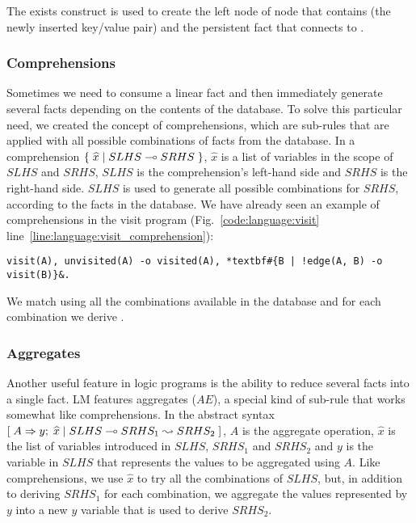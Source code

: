 The exists construct is used to create the left node of node  that
contains  (the newly inserted key/value pair) and
the persistent fact  that connects  to .

\subsubsection{Comprehensions}

Sometimes we need to consume a linear fact and then immediately generate several
facts depending on the contents of the database. To solve this particular need,
we created the concept of comprehensions, which are sub-rules that are applied
with all possible combinations of facts from the database. In a comprehension
$\{ \; \widehat{x} \; | \; SLHS \multimap SRHS \; \}$, $\widehat{x}$ is a list of variables
in the scope of $SLHS$ and $SRHS$, $SLHS$ is the comprehension's left-hand side
and $SRHS$ is the right-hand side. $SLHS$ is used to generate all possible
combinations for $SRHS$, according to the facts in the database. We have already
seen an example of comprehensions in the visit program
(Fig.~\ref{code:language:visit} line~\ref{line:language:visit_comprehension}):

\begin{Verbatim}[fontsize=\codesize,commandchars=\*\#\&]
visit(A), unvisited(A) -o visited(A), *textbf#{B | !edge(A, B) -o visit(B)}&.
\end{Verbatim}

We match  using all the combinations available in the database
and for each combination we derive .

\subsubsection{Aggregates}

Another useful feature in logic programs is the ability to reduce several facts
into a single fact. LM features aggregates ($AE$), a special kind of sub-rule
that works somewhat like comprehensions. In the abstract syntax
$[\; A \Rightarrow y; \; \widehat{x} \; | \; SLHS \multimap SRHS_1 \leadsto SRHS_2 \;]$, $A$ is the aggregate
operation, $\widehat{x}$ is the list of variables introduced in $SLHS$, $SRHS_1$
and $SRHS_2$ and $y$ is the variable in $SLHS$ that represents the values to be
aggregated using $A$. Like comprehensions, we use $\widehat{x}$ to try all the
combinations of $SLHS$, but, in addition to deriving $SRHS_1$ for each
combination, we aggregate the values represented by $y$ into a new $y$ variable
that is used to derive $SRHS_2$.

